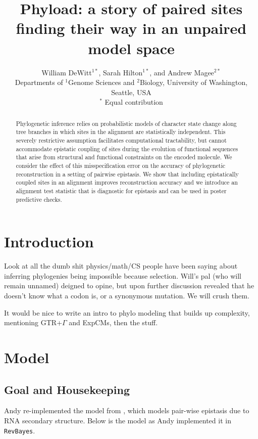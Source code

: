 \documentclass[11pt]{article}
\title{Phyload: a story of paired sites finding their way in an unpaired model space}
\author{
William DeWitt$^{1\ast}$, Sarah Hilton$^{1\ast}$, and Andrew Magee$^{2\ast}$\\
\small{Departments of $^1$Genome Sciences and $^2$Biology, University of Washington, Seattle, USA}\\
\small{$^\ast$ Equal contribution}
}
\begin{document}
\maketitle

\begin{abstract}
Phylogenetic inference relies on probabilistic models of character state change along tree branches in which sites in the alignment are statistically independent.
This severely restrictive assumption facilitates computational tractability, but cannot accommodate epistatic coupling of sites during the evolution of functional sequences that arise from structural and functional constraints on the encoded molecule.
We consider the effect of this misspecification error on the accuracy of phylogenetic reconstruction in a setting of pairwise epistasis.
We show that including epistatically coupled sites in an alignment improves reconstruction accuracy and we introduce an alignment test statistic that is diagnostic for epistasis and can be used in poster predictive checks.
\end{abstract}

\section*{{Introduction}\label{sec:intro}}

Look at all the dumb shit physics/math/CS people have been saying about inferring phylogenies being impossible because selection.
Will's pal (who will remain unnamed) deigned to opine, but upon further discussion revealed that he doesn't know what a codon is, or a synonymous mutation.
We will crush them.

It would be nice to write an intro to phylo modeling that builds up complexity, mentioning GTR+$\Gamma$ and ExpCMs, then the \cite{nasrallah2013phylogenetic} stuff.

\section*{Model\label{sec:Model}}

\subsection*{Goal and Housekeeping}

Andy re-implemented the model from \cite{nasrallah2013phylogenetic}, which models pair-wise epistasis due to RNA secondary structure.
Below is the model as Andy implemented it in \texttt{RevBayes}.
\end{document}

